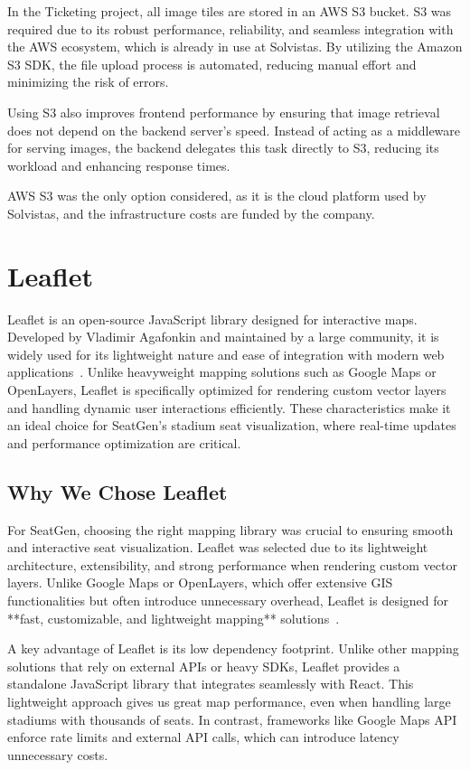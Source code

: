 In the Ticketing project, all image tiles are stored in an AWS S3 bucket. S3 was required due to its robust performance, reliability, and seamless integration with the AWS ecosystem, which is already in use at Solvistas. By utilizing the Amazon S3 SDK, the file upload process is automated, reducing manual effort and minimizing the risk of errors.

Using S3 also improves frontend performance by ensuring that image retrieval does not depend on the backend server’s speed. Instead of acting as a middleware for serving images, the backend delegates this task directly to S3, reducing its workload and enhancing response times.

AWS S3 was the only option considered, as it is the cloud platform used by Solvistas, and the infrastructure costs are funded by the company.

\section{Leaflet}
Leaflet is an open-source JavaScript library designed for interactive maps. Developed by Vladimir Agafonkin and maintained by a large community, it is widely used for its lightweight nature and ease of integration with modern web applications~\cite{Leaflet}. Unlike heavyweight mapping solutions such as Google Maps or OpenLayers, Leaflet is specifically optimized for rendering custom vector layers and handling dynamic user interactions efficiently. These characteristics make it an ideal choice for SeatGen’s stadium seat visualization, where real-time updates and performance optimization are critical.

\subsection{Why We Chose Leaflet}
For SeatGen, choosing the right mapping library was crucial to ensuring smooth and interactive seat visualization. Leaflet was selected due to its lightweight architecture, extensibility, and strong performance when rendering custom vector layers. Unlike Google Maps or OpenLayers, which offer extensive GIS functionalities but often introduce unnecessary overhead, Leaflet is designed for **fast, customizable, and lightweight mapping** solutions~\cite{Leaflet}. 

A key advantage of Leaflet is its low dependency footprint. Unlike other mapping solutions that rely on external APIs or heavy SDKs, Leaflet provides a standalone JavaScript library that integrates seamlessly with React. This lightweight approach gives us great map performance, even when handling large stadiums with thousands of seats. In contrast, frameworks like Google Maps API enforce rate limits and external API calls, which can introduce latency unnecessary costs.

